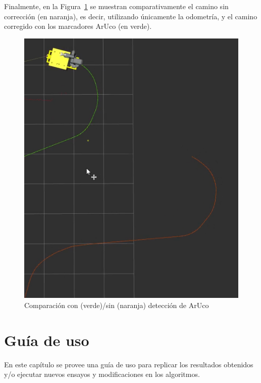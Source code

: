 \documentclass[12pt, a4paper]{report}
\begin{document}
		Finalmente, en la Figura~\ref{fig:resultados-comparacion} se muestran comparativamente el camino sin corrección (en naranja), es decir, utilizando únicamente la odometría, y el camino corregido con los marcadores ArUco (en verde).

		\begin{figure}[H]
			\centering
			\includegraphics[width=1\linewidth]{img/Captura desde 2024-02-28 11-11-17}
			\caption{Comparación con (verde)/sin (naranja) detección de ArUco}
			\label{fig:resultados-comparacion}
		\end{figure}

	\chapter{Guía de uso}\label{ch:guia-de-uso}
		En este capítulo se provee una guía de uso para replicar los resultados obtenidos y/o ejecutar nuevos ensayos y modificaciones en los algoritmos.
\end{document}
